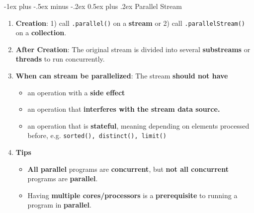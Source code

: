 \documentclass[10pt, landscape]{article}
\makeatletter
\renewcommand{\section}{\@startsection{section}{1}{0mm}%
                                {-1ex plus -.5ex minus -.2ex}%
                                {0.5ex plus .2ex}%
                                {\normalfont\large\bfseries}}
\makeatother
\begin{document}
\begin{multicols}{4}
\section{Parallel Stream}
\begin{enumerate}
    \item \textbf{Creation}: 1) call \texttt{.parallel()} on a \textbf{stream} or 2) call \texttt{.parallelStream()} on a \textbf{collection}.
    \item \textbf{After Creation}: The original stream is divided into several \textbf{substreams} or \textbf{threads} to run concurrently.
    \item \textbf{When can stream be parallelized}: The stream \textbf{should not have}
    \begin{itemize}
        \item an operation with a \textbf{side effect}
        \item an operation that \textbf{interferes with the stream data source.}
        \item an operation that is \textbf{stateful}, meaning depending on elements processed before, e.g. \texttt{sorted(), distinct(), limit()}
    \end{itemize}
    \item \textbf{Tips}
    \begin{itemize}
        \item \textbf{All parallel} programs are \textbf{concurrent}, but \textbf{not all concurrent} programs are \textbf{parallel}.
        \item Having \textbf{multiple cores/processors} is a \textbf{prerequisite} to running a program in \textbf{parallel}.
    \end{itemize}
\end{enumerate}


\end{multicols}
\end{document}
